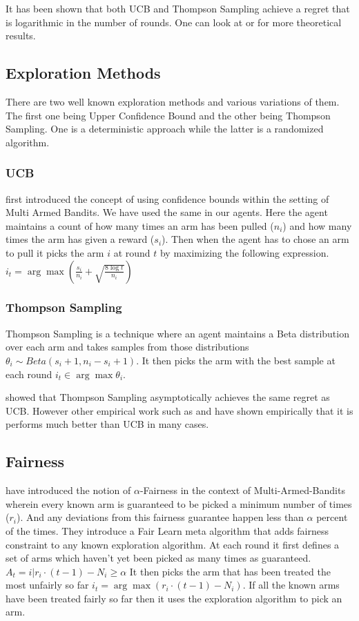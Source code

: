 It has been shown that both UCB and Thompson Sampling achieve a regret that is logarithmic in the number of rounds. One can look at  or  for more theoretical results.

\subsection{Exploration Methods}
There are two well known exploration methods and various variations of them. The first one being Upper Confidence Bound and the other being Thompson Sampling. One is a deterministic approach while the latter is a randomized algorithm.
\subsubsection{UCB}
 first introduced the concept of using confidence bounds within the setting of Multi Armed Bandits. We have used the same in our agents. Here the agent maintains a count of how many times an arm has been pulled ($n_i$) and how many times the arm has given a reward ($s_i$). Then when the agent has to chose an arm to pull it picks the arm $i$ at round $t$ by maximizing the following expression. $i_t = \arg\max ( \frac{s_i}{n_i} + \sqrt{\frac{8\log t}{n_i} })$

\subsubsection{Thompson Sampling}
Thompson Sampling is a technique where an agent maintains a Beta distribution over each arm and takes samples from those distributions $\theta_i \sim Beta(s_i + 1, n_i - s_i + 1)$. It then picks the arm with the best sample at each round $i_t \in \arg\max \theta_i$. 

 showed that Thompson Sampling asymptotically achieves the same regret as UCB. However other empirical work such as  and  have shown empirically that it is performs much better than UCB in many cases. 

\subsection{Fairness}
 have introduced the notion of $\alpha$-Fairness in the context of Multi-Armed-Bandits wherein every known arm is guaranteed to be picked a minimum number of times ($r_i$). And any deviations from this fairness guarantee happen less than $\alpha$ percent of the times. They introduce a Fair Learn meta algorithm that adds fairness constraint to any known exploration algorithm. At each round it first defines a set of arms which haven't yet been picked as many times as guaranteed. $A_t = {i | r_i \cdot (t-1) - N_i \geq \alpha}$ It then picks the arm that has been treated the most unfairly so far $i _t = \arg\max (r_i \cdot (t-1) - N_i)$. If all the known arms have been treated fairly so far then it uses the exploration algorithm to pick an arm.